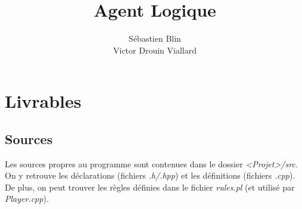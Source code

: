 \documentclass{article}
\title{Agent Logique}
\author{Sébastien Blin\\Victor Drouin Viallard}
\begin{document}
\maketitle

\sectioncompilation[0]

\section{Livrables}
\subsection{Sources}
Les sources propres au programme sont contenues dans le dossier
\emph{<Projet>/src}. On y retrouve les déclarations (fichiers \emph{.h/.hpp}) et
les définitions (fichiers \emph{.cpp}). De plus, on peut trouver les règles
définies dans le fichier \emph{rules.pl} (et utilisé par \emph{Player.cpp}).
\end{document}

